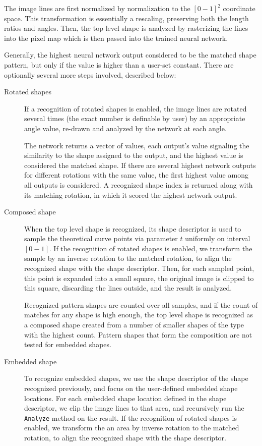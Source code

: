 The image lines are first normalized by normalization to the $[0-1]^2$ coordinate space. This transformation is essentially a rescaling, preserving both the length ratios and angles. Then, the top level shape is analyzed by rasterizing the lines into the pixel map which is then passed into the trained neural network.

Generally, the highest neural network output considered to be the matched shape pattern, but only if the value is higher than a user-set constant. There are optionally several more steps involved, described below:

\begin{description}
\item [Rotated shapes] If a recognition of rotated shapes is enabled, the image lines are rotated several times (the exact number is definable by user) by an appropriate angle value, re-drawn and analyzed by the network at each angle.

The network returns a vector of values, each output's value signaling the similarity to the shape assigned to the output, and the highest value is considered the matched shape. If there are several highest network outputs for different rotations with the same value, the first highest value among all outputs is considered. A recognized shape index is returned along with its matching rotation, in which it scored the highest network output.

\item[Composed shape]
When the top level shape is recognized, its shape descriptor is used to sample the theoretical curve points via parameter $t$ uniformly on interval $[0-1]$. If the recognition of rotated shapes is enabled, we transform the sample by an inverse rotation to the matched rotation, to align the recognized shape with the shape descriptor. Then, for each sampled point, this point is expanded into a small square, the original image is clipped to this square, discarding the lines outside, and the result is analyzed. 

Recognized pattern shapes are counted over all samples, and if the count of matches for any shape is high enough, the top level shape is recognized as a composed shape created from a number of smaller shapes of the type with the highest count. Pattern shapes that form the composition are not tested for embedded shapes.

\item [Embedded shape]
To recognize embedded shapes, we use the shape descriptor of the shape recognized previously, and focus on the user-defined embedded shape locations. For each embedded shape location defined in the shape descriptor, we clip the image lines to that area, and recursively run the \texttt{Analyze} method on the result. If the recognition of rotated shapes is enabled, we transform the an area by inverse rotation to the matched rotation, to align the recognized shape with the shape descriptor.
\end{description}

